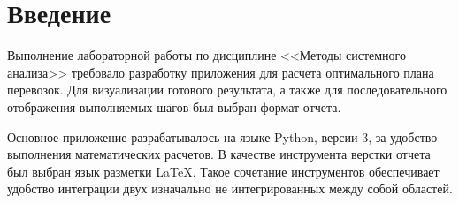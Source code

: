 \section*{Введение}

Выполнение лабораторной работы по дисциплине <<Методы системного анализа>> требовало разработку приложения для расчета оптимального плана перевозок. Для визуализации готового результата, а также для последовательного отображения выполняемых шагов был выбран формат отчета.

Основное приложение разрабатывалось на языке Python, версии 3, за удобство выполнения математических расчетов. В качестве инструмента верстки отчета был выбран язык разметки \LaTeX. Такое сочетание инструментов обеспечивает удобство интеграции двух изначально не интегрированных между собой областей.
